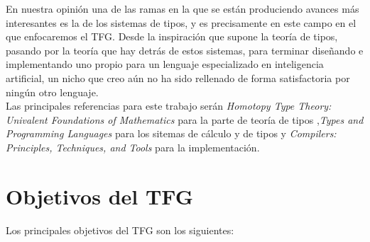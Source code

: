 En nuestra opinión una de las ramas en la que se están produciendo avances más interesantes es la de los sistemas de tipos, y es precisamente en este campo en el que enfocaremos el TFG. Desde la inspiración que supone la teoría de tipos, pasando por la teoría que hay detrás de estos sistemas, para terminar diseñando e implementando uno propio para un lenguaje especializado en inteligencia artificial, un nicho que creo aún no ha sido rellenado de forma satisfactoria por ningún otro lenguaje.\\

Las principales referencias para este trabajo serán \textit{Homotopy Type Theory: Univalent Foundations of Mathematics} \cite{hottbook} para la parte de teoría de tipos ,\textit{Types and Programming Languages} \cite{TPL} para los sitemas de cálculo y de tipos y \textit{Compilers: Principles, Techniques, and Tools} \cite{dragoonBook} para la implementación.\\

\section{Objetivos del TFG}
Los principales objetivos del TFG son los siguientes:\\

